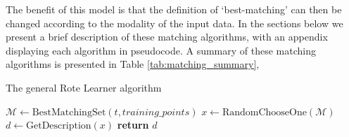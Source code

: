 The benefit of this model is that the definition of `best-matching' can then be changed according to the modality of the input data. In the sections below we present a brief description of these matching algorithms, with an appendix displaying each algorithm in pseudocode. A summary of these matching algorithms is presented in Table \ref{tab:matching_summary}, 

\begin{algorithm}
    \caption{The general Rote Learner algorithm }
    \label{alg:rote_learner_general}
    \begin{algorithmic}
        \State $\mathcal{M} \gets \text{BestMatchingSet}(t, training\_points)$
        \State $x \gets \text{RandomChooseOne}(\mathcal{M})$
        \State $d \gets \text{GetDescription}(x)$
        \State \textbf{return} $d$
        \EndProcedure
    \end{algorithmic}
\end{algorithm}

